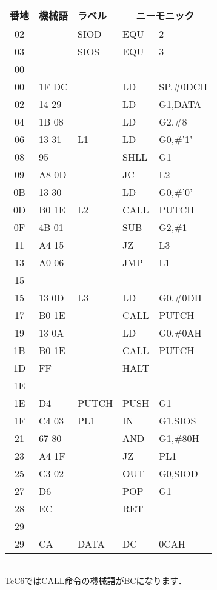 \begin{center}
{\small\tt
\begin{tabular}{|c|l|l|l l |} \hline
番地 & 機械語 & ラベル & \multicolumn{2}{|c|}{ニーモニック} \\
\hline
02 &       & SIOD   & EQU    & 2                 \\
03 &       & SIOS   & EQU    & 3                 \\
00 &       &        &        &                   \\
00 & 1F DC &        & LD     & SP,\#0DCH         \\
02 & 14 29 &        & LD     & G1,DATA           \\
04 & 1B 08 &        & LD     & G2,\#8            \\
06 & 13 31 & L1     & LD     & G0,\#'1'          \\
08 & 95    &        & SHLL   & G1                \\
09 & A8 0D &        & JC     & L2                \\
0B & 13 30 &        & LD     & G0,\#'0'          \\
0D & B0 1E & L2     & CALL   & PUTCH             \\
0F & 4B 01 &        & SUB    & G2,\#1            \\
11 & A4 15 &        & JZ     & L3                \\
13 & A0 06 &        & JMP    & L1                \\
15 &       &        &        &                   \\
15 & 13 0D & L3     & LD     & G0,\#0DH          \\
17 & B0 1E &        & CALL   & PUTCH             \\
19 & 13 0A &        & LD     & G0,\#0AH          \\
1B & B0 1E &        & CALL   & PUTCH             \\
1D & FF    &        & HALT   &                   \\
1E &       &        &        &                   \\
1E & D4    & PUTCH  & PUSH   & G1                \\
1F & C4 03 & PL1    & IN     & G1,SIOS           \\
21 & 67 80 &        & AND    & G1,\#80H          \\
23 & A4 1F &        & JZ     & PL1               \\
25 & C3 02 &        & OUT    & G0,SIOD           \\
27 & D6    &        & POP    & G1                \\
28 & EC    &        & RET    &                   \\
29 &       &        &        &                   \\
29 & CA    & DATA   & DC     & 0CAH              \\
\hline
\end{tabular}
\\TeC6ではCALL命令の機械語がBCになります．
}
\end{center}

